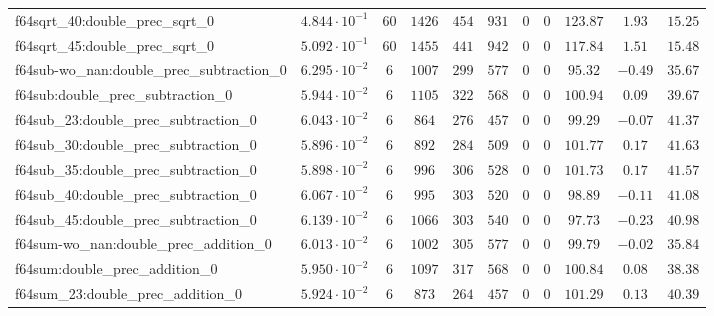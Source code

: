 \begin{tabular}{|l|c|c|c|c|c|c|c|c|c|c|}
f64sqrt\_40:double\_prec\_sqrt\_0              & $ 4.844 \cdot 10^{-1} $ & $ 60     $ & $ 1426   $ & $ 454   $ & $ 931   $ & $ 0   $ & $ 0 $ & $ 123.87      $ & $ 1.93    $ & $ 15.25   $ \\
f64sqrt\_45:double\_prec\_sqrt\_0              & $ 5.092 \cdot 10^{-1} $ & $ 60     $ & $ 1455   $ & $ 441   $ & $ 942   $ & $ 0   $ & $ 0 $ & $ 117.84      $ & $ 1.51    $ & $ 15.48   $ \\
f64sub-wo\_nan:double\_prec\_subtraction\_0    & $ 6.295 \cdot 10^{-2} $ & $ 6      $ & $ 1007   $ & $ 299   $ & $ 577   $ & $ 0   $ & $ 0 $ & $ 95.32       $ & $ -0.49   $ & $ 35.67   $ \\
f64sub:double\_prec\_subtraction\_0            & $ 5.944 \cdot 10^{-2} $ & $ 6      $ & $ 1105   $ & $ 322   $ & $ 568   $ & $ 0   $ & $ 0 $ & $ 100.94      $ & $ 0.09    $ & $ 39.67   $ \\
f64sub\_23:double\_prec\_subtraction\_0        & $ 6.043 \cdot 10^{-2} $ & $ 6      $ & $ 864    $ & $ 276   $ & $ 457   $ & $ 0   $ & $ 0 $ & $ 99.29       $ & $ -0.07   $ & $ 41.37   $ \\
f64sub\_30:double\_prec\_subtraction\_0        & $ 5.896 \cdot 10^{-2} $ & $ 6      $ & $ 892    $ & $ 284   $ & $ 509   $ & $ 0   $ & $ 0 $ & $ 101.77      $ & $ 0.17    $ & $ 41.63   $ \\
f64sub\_35:double\_prec\_subtraction\_0        & $ 5.898 \cdot 10^{-2} $ & $ 6      $ & $ 996    $ & $ 306   $ & $ 528   $ & $ 0   $ & $ 0 $ & $ 101.73      $ & $ 0.17    $ & $ 41.57   $ \\
f64sub\_40:double\_prec\_subtraction\_0        & $ 6.067 \cdot 10^{-2} $ & $ 6      $ & $ 995    $ & $ 303   $ & $ 520   $ & $ 0   $ & $ 0 $ & $ 98.89       $ & $ -0.11   $ & $ 41.08   $ \\
f64sub\_45:double\_prec\_subtraction\_0        & $ 6.139 \cdot 10^{-2} $ & $ 6      $ & $ 1066   $ & $ 303   $ & $ 540   $ & $ 0   $ & $ 0 $ & $ 97.73       $ & $ -0.23   $ & $ 40.98   $ \\
f64sum-wo\_nan:double\_prec\_addition\_0       & $ 6.013 \cdot 10^{-2} $ & $ 6      $ & $ 1002   $ & $ 305   $ & $ 577   $ & $ 0   $ & $ 0 $ & $ 99.79       $ & $ -0.02   $ & $ 35.84   $ \\
f64sum:double\_prec\_addition\_0               & $ 5.950 \cdot 10^{-2} $ & $ 6      $ & $ 1097   $ & $ 317   $ & $ 568   $ & $ 0   $ & $ 0 $ & $ 100.84      $ & $ 0.08    $ & $ 38.38   $ \\
f64sum\_23:double\_prec\_addition\_0           & $ 5.924 \cdot 10^{-2} $ & $ 6      $ & $ 873    $ & $ 264   $ & $ 457   $ & $ 0   $ & $ 0 $ & $ 101.29      $ & $ 0.13    $ & $ 40.39   $ \\

\end{tabular}
